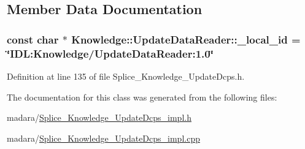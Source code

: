 \subsection{Member Data Documentation}
\hypertarget{classKnowledge_1_1UpdateDataReader_ae66465e3f4a52332b3d16cc911c7b290}{
\subsubsection[{\_\-local\_\-id}]{\setlength{\rightskip}{0pt plus 5cm}const char $\ast$ {\bf Knowledge::UpdateDataReader::\_\-local\_\-id} = \char`\"{}IDL:Knowledge/UpdateDataReader:1.0\char`\"{}}}
\label{d7/d6e/classKnowledge_1_1UpdateDataReader_ae66465e3f4a52332b3d16cc911c7b290}


Definition at line 135 of file Splice\_\-Knowledge\_\-UpdateDcps.h.



The documentation for this class was generated from the following files:\begin{DoxyCompactItemize}
\item 
madara/\hyperlink{Splice__Knowledge__UpdateDcps__impl_8h}{Splice\_\-Knowledge\_\-UpdateDcps\_\-impl.h}\item 
madara/\hyperlink{Splice__Knowledge__UpdateDcps__impl_8cpp}{Splice\_\-Knowledge\_\-UpdateDcps\_\-impl.cpp}\end{DoxyCompactItemize}
